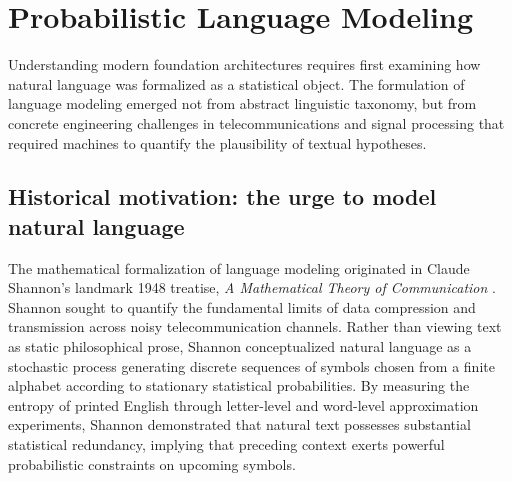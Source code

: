 \documentclass[../../../main.tex]{subfiles}
\begin{document}
\clearpage
\section{Probabilistic Language Modeling}
\label{sec:lm_intro_task}

Understanding modern foundation architectures requires first examining how natural language was formalized as a statistical object. The formulation of language modeling emerged not from abstract linguistic taxonomy, but from concrete engineering challenges in telecommunications and signal processing that required machines to quantify the plausibility of textual hypotheses.

\subsection{Historical motivation: the urge to model natural language}
\label{subsec:lm_historical_motivation}

The mathematical formalization of language modeling originated in Claude Shannon's landmark 1948 treatise, \textit{A Mathematical Theory of Communication} \citep{shannon1948}. Shannon sought to quantify the fundamental limits of data compression and transmission across noisy telecommunication channels. Rather than viewing text as static philosophical prose, Shannon conceptualized natural language as a stochastic process generating discrete sequences of symbols chosen from a finite alphabet according to stationary statistical probabilities. By measuring the entropy of printed English through letter-level and word-level approximation experiments, Shannon demonstrated that natural text possesses substantial statistical redundancy, implying that preceding context exerts powerful probabilistic constraints on upcoming symbols.
\end{document}
